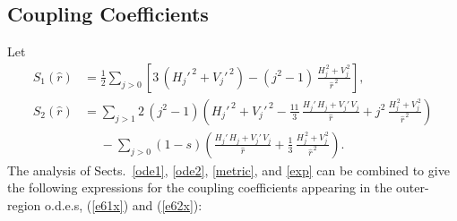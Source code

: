 \documentclass[12pt,prb,aps]{revtex4-1}
\begin{document}
\subsection{Coupling Coefficients}\label{coupl}
Let
\begin{align}
S_1(\hat{r})&= \frac{1}{2}\sum_{j>0}\left[3\,(H_j'^{\,2}+V_j'^{\,2}) - (j^2-1)\,\frac{H_j^{\,2}+V_j^{\,2}}{\hat{r}^{\,2}}\right],\\[0.5ex]
S_2(\hat{r})&= \sum_{j>1}2\,(j^2-1)\left(H_j'^{\,2}+V_j'^{\,2}-\frac{11}{3}\,\frac{H_j'\,H_j+V_j'\,V_j}{\hat{r}}+j^2\,\frac{H_j^{\,2}+V_j^{\,2}}{\hat{r}^{\,2}}\right)\nonumber\\[0.5ex]&\phantom{=} -\sum_{j>0}(1-s)\left(\frac{H_j'\,H_j+V_j'\,V_j}{\hat{r}}+\frac{1}{3}\,\frac{H_j^{\,2}+V_j^{\,2}}{\hat{r}^{\,2}}\right).
\end{align}
The analysis of Sects.~\ref{ode1}, \ref{ode2}, \ref{metric}, and \ref{exp} can be combined to give
the following expressions for the coupling coefficients appearing in the outer-region  o.d.e.s, (\ref{e61x}) and (\ref{e62x}):\,\cite{am1}
\end{document}
